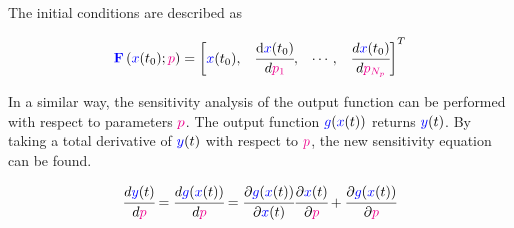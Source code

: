 \documentclass[../Article_Model_Parameters.tex]{subfiles}
\begin{document}
	The initial conditions are described as
	
	{\footnotesize
		\begin{align}
			{\color{blue}\textbf{F}}\left({\color{blue}x}(t_0);{\color{magenta}p}\right)  = 
			\begin{bmatrix} {\color{blue}x}(t_0),			& 
				\cfrac{ \text{d}{\color{blue}x}(t_0) }{ d{\color{magenta}p_1} },		& 
				\cdots,					 	&
				\cfrac{ d{\color{blue}x}(t_0) }{ d{\color{magenta}p_{N_p}} } 
			\end{bmatrix}^T
	\end{align} }
	
	In a similar way, the sensitivity analysis of the output function can be performed with respect to parameters ${\color{magenta}p}$. The output function ${\color{blue}g}({\color{blue}x}(t))$ returns ${\color{blue}y}(t)$. By taking a total derivative of ${\color{blue}y}(t)$ with respect to ${\color{magenta}p}$, the new sensitivity equation can be found.
	
	{\footnotesize
		\begin{align}
			\cfrac{d {\color{blue}y}(t)}{d{\color{magenta}p}} = \cfrac{d {\color{blue}g}({\color{blue}x}(t))}{d{\color{magenta}p}} = \cfrac{\partial {\color{blue}g}({\color{blue}x}(t))}{\partial {\color{blue}x}(t)} \cfrac{\partial {\color{blue}x}(t)}{\partial {\color{magenta}p}} + \cfrac{\partial {\color{blue}g}({\color{blue}x}(t))}{\partial {\color{magenta}p}}
	\end{align} }
	
\end{document}
